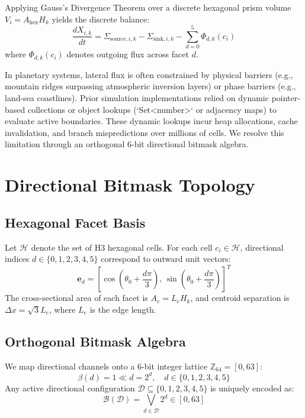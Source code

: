 \documentclass[10pt,twocolumn,letterpaper]{article}
\begin{document}
Applying Gauss's Divergence Theorem over a discrete hexagonal prism volume $V_i = A_{\text{hex}} H_k$ yields the discrete balance:
\begin{equation}
  \frac{d X_{i, k}}{dt} = \Sigma_{\text{source}, i, k} - \Sigma_{\text{sink}, i, k} - \sum_{d=0}^{5} \Phi_{d, k}(c_i)
\end{equation}
where $\Phi_{d, k}(c_i)$ denotes outgoing flux across facet $d$.

In planetary systems, lateral flux is often constrained by physical barriers (e.g., mountain ridges surpassing atmospheric inversion layers) or phase barriers (e.g., land-sea coastlines). Prior simulation implementations relied on dynamic pointer-based collections or object lookups (`Set<number>` or adjacency maps) to evaluate active boundaries. These dynamic lookups incur heap allocations, cache invalidation, and branch mispredictions over millions of cells. We resolve this limitation through an orthogonal 6-bit directional bitmask algebra.

\section{Directional Bitmask Topology}

\subsection{Hexagonal Facet Basis}
Let $\mathcal{H}$ denote the set of H3 hexagonal cells. For each cell $c_i \in \mathcal{H}$, directional indices $d \in \{0, 1, 2, 3, 4, 5\}$ correspond to outward unit vectors:
\begin{equation}
  \mathbf{e}_d = \left[ \cos\left(\theta_0 + \frac{d\pi}{3}\right), \, \sin\left(\theta_0 + \frac{d\pi}{3}\right) \right]^T
\end{equation}
The cross-sectional area of each facet is $A_e = L_e H_k$, and centroid separation is $\Delta x = \sqrt{3} L_e$, where $L_e$ is the edge length.

\subsection{Orthogonal Bitmask Algebra}
We map directional channels onto a 6-bit integer lattice $\mathbb{Z}_{64} = [0, 63]$:
\begin{equation}
  \beta(d) = 1 \ll d = 2^d, \quad d \in \{0, 1, 2, 3, 4, 5\}
\end{equation}
Any active directional configuration $\mathcal{D} \subseteq \{0, 1, 2, 3, 4, 5\}$ is uniquely encoded as:
\begin{equation}
  \mathcal{B}(\mathcal{D}) = \bigvee_{d \in \mathcal{D}} 2^d \in [0, 63]
\end{equation}
\end{document}
